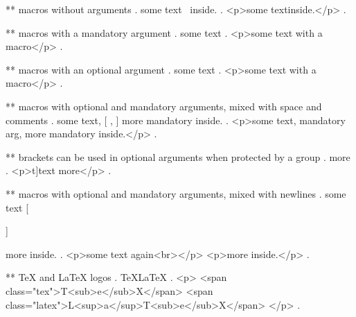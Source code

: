 ** macros without arguments
.
some text \echo\ inside.
.
<p>some text ​ inside.</p>
.

** macros with a mandatory argument
.
some text 
.
<p>some text with a macro</p>
.

** macros with an optional argument
.
some text 
.
<p>some text with a macro</p>
.


** macros with optional and mandatory arguments, mixed with space and comments
.
some text,  [%
,  %
 ]
 {more mandatory} inside.
.
<p>some text, mandatory arg, more mandatory​ inside.</p>
.


** brackets can be used in optional arguments when protected by a group
.
\echo[{t]}t]{ext} more
.
<p>t]text​ more</p>
.



** macros with optional and mandatory arguments, mixed with newlines
.
some text  [ %

 ]%

  {more} inside.
.
<p>some text again<br></p>
<p>more inside.</p>
.


** TeX and LaTeX logos
.
\TeX \LaTeX
.
<p>
<span class="tex">T<sub>e</sub>X</span>
<span class="latex">L<sup>a</sup>T<sub>e</sub>X</span>
</p>
.
